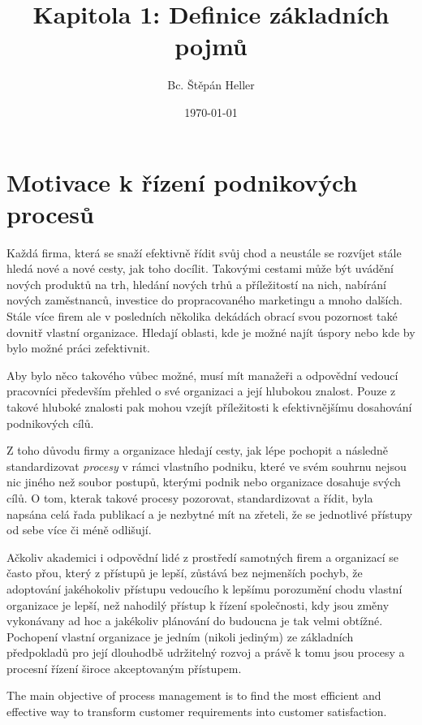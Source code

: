\documentclass[]{article}
\begin{document}
\title{Kapitola 1: Definice základních pojmů}
\author{Bc. Štěpán Heller}
\date{\today}
\maketitle

\section{Motivace k řízení podnikových procesů}
Každá firma, která se snaží efektivně řídit svůj chod a neustále se rozvíjet stále hledá nové a nové cesty, jak toho docílit. Takovými cestami může být uvádění nových produktů na trh, hledání nových trhů a příležitostí na nich, nabírání nových zaměstnanců, investice do propracovaného marketingu a mnoho dalších. Stále více firem ale v posledních několika dekádách obrací svou pozornost také dovnitř vlastní organizace. Hledají oblasti, kde je možné najít úspory nebo kde by bylo možné práci zefektivnit.

Aby bylo něco takového vůbec možné, musí mít manažeři a odpovědní vedoucí pracovníci především přehled o své organizaci a její hlubokou znalost. Pouze z takové hluboké znalosti pak mohou vzejít příležitosti k efektivnějšímu dosahování podnikových cílů.

Z toho důvodu firmy a organizace hledají cesty, jak lépe pochopit a následně standardizovat \textit{procesy} v rámci vlastního podniku, které ve svém souhrnu nejsou nic jiného než soubor postupů, kterými podnik nebo organizace dosahuje svých cílů. O tom, kterak takové procesy pozorovat, standardizovat a řídit, byla napsána celá řada publikací a je nezbytné mít na zřeteli, že se jednotlivé přístupy od sebe více či méně odlišují. 

Ačkoliv akademici i odpovědní lidé z prostředí samotných firem a organizací se často přou, který z přístupů je lepší, zůstává bez nejmenších pochyb, že adoptování jakéhokoliv přístupu vedoucího k lepšímu porozumění chodu vlastní organizace je lepší, než nahodilý přístup k řízení společnosti, kdy jsou změny vykonávany ad hoc a jakékoliv plánování do budoucna je tak velmi obtížné. Pochopení vlastní organizace je jedním (nikoli jediným) ze základních předpokladů pro její dlouhodbě udržitelný rozvoj a právě k tomu jsou procesy a procesní řízení široce akceptovaným přístupem.

The main objective of process management is to find the most efficient and effective way to transform customer requirements into customer satisfaction. 
\end{document}
